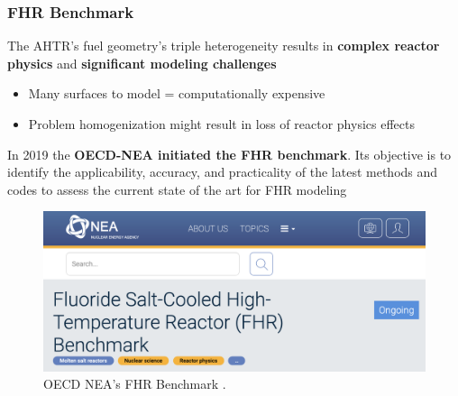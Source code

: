     \begin{frame}
    \frametitle{FHR Benchmark}
    The AHTR's fuel geometry's triple heterogeneity results in
    \textbf{complex reactor physics} and \textbf{significant modeling challenges}
    \begin{itemize}
        \item Many surfaces to model = computationally expensive 
        \item Problem homogenization might result in loss of reactor physics effects 
    \end{itemize}

    \vspace{0.3cm}
    In 2019 the \textbf{OECD-NEA initiated the FHR benchmark}. Its objective 
    is to identify the applicability, accuracy, and practicality of the latest 
    methods and codes to assess the current state of the art for FHR modeling
    \begin{figure}[]
        \includegraphics[width=0.55\linewidth]{figures/benchmark.png} 
        \caption{OECD NEA's FHR Benchmark \cite{petrovic_benchmark_2021}.}
    \end{figure}
    \end{frame}

